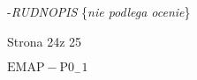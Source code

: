 \documentclass[a4paper,12pt]{article}
\begin{document}
-{\it RUDNOPIS} \{{\it nie podlega ocenie}\}

Strona 24z 25

$\mathrm{E}\mathrm{M}\mathrm{A}\mathrm{P}-\mathrm{P}0_{-}1$
\end{document}
